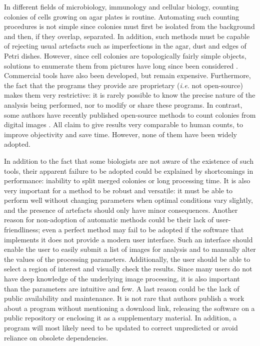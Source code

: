 \documentclass[10pt]{article}
\begin{document}
In different fields of microbiology, immunology and cellular biology, counting
colonies of cells growing on agar plates is routine.
Automating such counting procedures is not simple since colonies must first be isolated
from the background and then, if they overlap, separated. In addition, such methods must be capable of rejecting usual artefacts
such as imperfections in the agar, dust and edges of Petri dishes.
However, since cell colonies are topologically fairly simple objects, solutions to
enumerate them from pictures have long since been considered
\cite{mansberg_automatic_1957,mukherjee_bacterial_1995}. Commercial tools have
also been developed\cite{putman_simplified_2005}, but remain expensive.
Furthermore, the fact that the programs they provide are proprietary 
(\emph{i.e.} not open-source) makes them very restrictive: it is rarely possible
to know the precise nature of the analysis being performed, nor to modify or
share these programs.
In contrast, some authors have recently published open-source methods to count
colonies from digital
images\cite{cai_optimized_2011,bewes_automated_2008,niyazi_counting_2007,clarke_lowcost_2010,sieuwerts_simple_2008,vokes_using_2008,brugger_automated_2012}
.
All claim to give results very comparable to human counts, to improve
objectivity and save time. However, none of them have been widely adopted. 


In addition to the fact that some biologists are not aware of the existence of such
tools, their apparent failure to be adopted could be explained by shortcomings
in performance: inability to split merged colonies
or long processing time. It is also very important for a method to be robust and versatile:
it must be able to perform well without changing parameters when optimal conditions vary slightly,
and the presence of artefacts should only have minor consequences.
Another reason for non-adoption of automatic methods could be their lack of
user-friendliness; even a perfect method may fail to be adopted if the software
that implements it does not provide a modern user interface. Such an interface
should enable the user to easily submit a list of images for analysis and to
manually alter the values of the processing parameters. Additionally, the user
should be able to select a region of interest and visually check the results.
Since many users do not have deep knowledge of the underlying image processing, 
it is also important than the parameters are intuitive and few.
A last reason could be the lack of public availability
and maintenance. It is not rare that authors publish a work about a
program without mentioning a download link, releasing the software on a public
repository or enclosing it as a supplementary
material\cite{bewes_automated_2008,kachouie_arraycount_2009}.
In addition, a program will most likely need to be updated to correct
unpredicted  or avoid reliance on obsolete dependencies.
\end{document}
